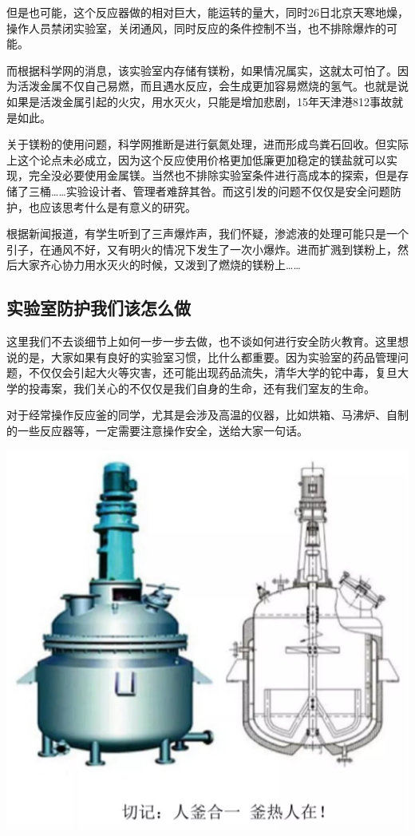\documentclass[]{book}
\begin{document}
但是也可能，这个反应器做的相对巨大，能运转的量大，同时26日北京天寒地燥，操作人员禁闭实验室，关闭通风，同时反应的条件控制不当，也不排除爆炸的可能。

而根据科学网的消息，该实验室内存储有镁粉，如果情况属实，这就太可怕了。因为活泼金属不仅自己易燃，而且遇水反应，会生成更加容易燃烧的氢气。也就是说如果是活泼金属引起的火灾，用水灭火，只能是增加悲剧，15年天津港812事故就是如此。

关于镁粉的使用问题，科学网推断是进行氨氮处理，进而形成鸟粪石回收。但实际上这个论点未必成立，因为这个反应使用价格更加低廉更加稳定的镁盐就可以实现，完全没必要使用金属镁。当然也不排除实验室条件进行高成本的探索，但是存储了三桶\ldots{}\ldots{}实验设计者、管理者难辞其咎。而这引发的问题不仅仅是安全问题防护，也应该思考什么是有意义的研究。

根据新闻报道，有学生听到了三声爆炸声，我们怀疑，渗滤液的处理可能只是一个引子，在通风不好，又有明火的情况下发生了一次小爆炸。进而扩溅到镁粉上，然后大家齐心协力用水灭火的时候，又泼到了燃烧的镁粉上\ldots{}\ldots{}

\hypertarget{ux5b9eux9a8cux5ba4ux9632ux62a4ux6211ux4eecux8be5ux600eux4e48ux505a}{%
\subsection{实验室防护我们该怎么做}\label{ux5b9eux9a8cux5ba4ux9632ux62a4ux6211ux4eecux8be5ux600eux4e48ux505a}}

这里我们不去谈细节上如何一步一步去做，也不谈如何进行安全防火教育。这里想说的是，大家如果有良好的实验室习惯，比什么都重要。因为实验室的药品管理问题，不仅仅会引起大火等灾害，还可能出现药品流失，清华大学的铊中毒，复旦大学的投毒案，我们关心的不仅仅是我们自身的生命，还有我们室友的生命。

对于经常操作反应釜的同学，尤其是会涉及高温的仪器，比如烘箱、马沸炉、自制的一些反应器等，一定需要注意操作安全，送给大家一句话。

\includegraphics[width=6.67in]{images/slybz4}
\end{document}
